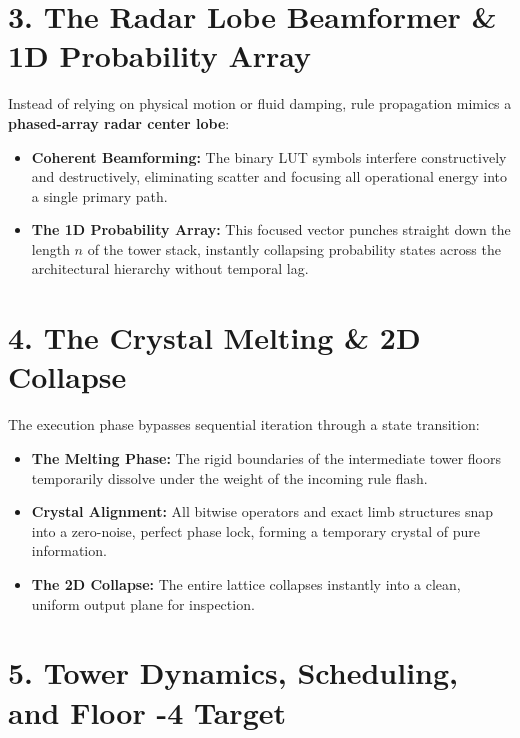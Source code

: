 \medskip

\section{\texorpdfstring{3. The Radar Lobe Beamformer \& 1D Probability Array}{3. The Radar Lobe Beamformer \& 1D Probability Array}}

Instead of relying on physical motion or fluid damping, rule propagation mimics a \textbf{phased-array radar center lobe}:

\begin{itemize}
\item \textbf{Coherent Beamforming:} The binary LUT symbols interfere constructively and destructively, eliminating scatter and focusing all operational energy into a single primary path.
\item \textbf{The 1D Probability Array:} This focused vector punches straight down the length \(n\) of the tower stack, instantly collapsing probability states across the architectural hierarchy without temporal lag.
\end{itemize}

\medskip

\section{\texorpdfstring{4. The Crystal Melting \& 2D Collapse}{4. The Crystal Melting \& 2D Collapse}}

The execution phase bypasses sequential iteration through a state transition:

\begin{itemize}
\item \textbf{The Melting Phase:} The rigid boundaries of the intermediate tower floors temporarily dissolve under the weight of the incoming rule flash.
\item \textbf{Crystal Alignment:} All bitwise operators and exact limb structures snap into a zero-noise, perfect phase lock, forming a temporary crystal of pure information.
\item \textbf{The 2D Collapse:} The entire lattice collapses instantly into a clean, uniform output plane for inspection.
\end{itemize}

\medskip

\section{\texorpdfstring{5. Tower Dynamics, Scheduling, and Floor -4 Target}{5. Tower Dynamics, Scheduling, and Floor -4 Target}}

